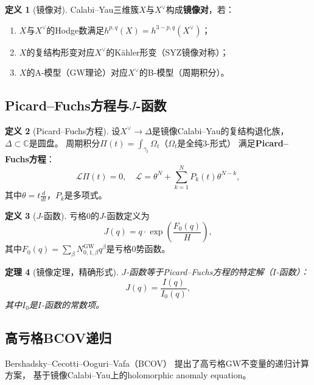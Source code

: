 \documentclass[11pt,a4paper]{article}
\theoremstyle{plain}
\newtheorem{theorem}{定理}[section]
\theoremstyle{definition}
\newtheorem{definition}[theorem]{定义}
\newcommand{\C}{\mathbb{C}}
\newcommand{\GWinv}{N^{\mathrm{GW}}}
\begin{document}
\begin{definition}[镜像对]\label{def:mirrorpair}
Calabi--Yau三维簇$X$与$X^\vee$构成\textbf{镜像对}，若：
\begin{enumerate}[label=(\arabic*)]
\item $X$与$X^\vee$的Hodge数满足$h^{p,q}(X) = h^{3-p,q}(X^\vee)$；
\item $X$的复结构形变对应$X^\vee$的Kähler形变（SYZ镜像对称）；
\item $X$的A-模型（GW理论）对应$X^\vee$的B-模型（周期积分）。
\end{enumerate}
\end{definition}

\subsection{Picard--Fuchs方程与$J$-函数}

\begin{definition}[Picard--Fuchs方程]\label{def:pf}
设$X^\vee \to \Delta$是镜像Calabi--Yau的复结构退化族，
$\Delta \subset \C$是圆盘。
周期积分$\Pi(t) = \int_{\gamma_t} \Omega_t$（$\Omega_t$是全纯3-形式）
满足\textbf{Picard--Fuchs方程}：
\begin{equation}\label{eq:pf}
\mathcal{L} \Pi(t) = 0, \quad
\mathcal{L} = \theta^N + \sum_{k=1}^N P_k(t) \theta^{N-k},
\end{equation}
其中$\theta = t \frac{d}{dt}$，$P_k$是多项式。
\end{definition}

\begin{definition}[$J$-函数]\label{def:jfunc}
亏格0的$J$-函数定义为
\begin{equation}\label{eq:jfunc}
J(q) = q \cdot \exp\left( \frac{F_0(q)}{H} \right),
\end{equation}
其中$F_0(q) = \sum_\beta \GWinv_{0,1,\beta} q^\beta$是亏格0势函数。
\end{definition}

\begin{theorem}[镜像定理，精确形式]\label{thm:mirror2}
$J$-函数等于Picard--Fuchs方程的特定解（$I$-函数）：
\[
J(q) = \frac{I(q)}{I_0(q)},
\]
其中$I_0$是$I$-函数的常数项。
\end{theorem}

\subsection{高亏格BCOV递归}

Bershadsky--Cecotti--Ooguri--Vafa（BCOV）\cite{BCOV1994}
提出了高亏格GW不变量的递归计算方案，
基于镜像Calabi--Yau上的holomorphic anomaly equation。
\end{document}
